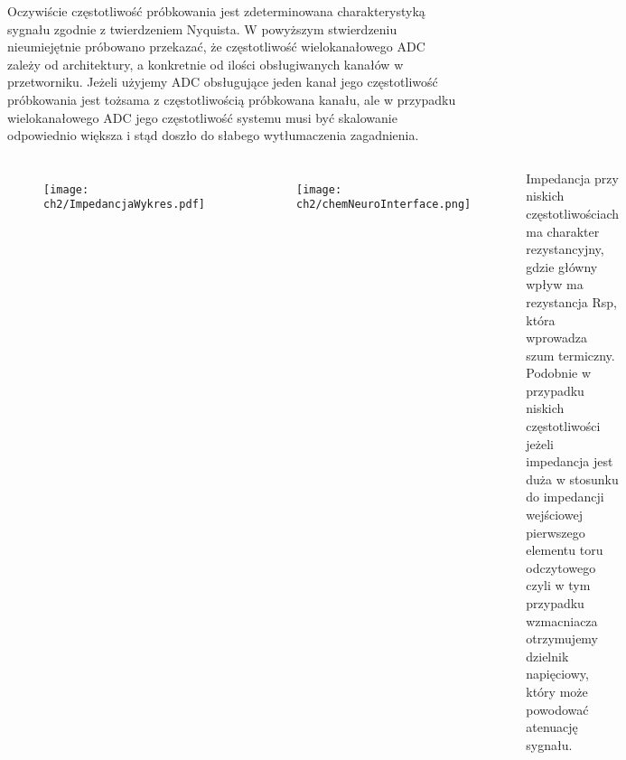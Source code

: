\begin{frame}[t]
    \begin{block}{\dk}
    \end{block}
    Oczywiście częstotliwość próbkowania jest zdeterminowana charakterystyką sygnału zgodnie z twierdzeniem Nyquista.
    W powyższym stwierdzeniu nieumiejętnie próbowano przekazać, że częstotliwość wielokanałowego ADC zależy od architektury, a konkretnie od ilości obsługiwanych kanałów w przetworniku.
    Jeżeli użyjemy ADC obsługujące jeden kanał jego częstotliwość próbkowania jest tożsama z częstotliwością próbkowana kanału, ale w przypadku wielokanałowego ADC jego częstotliwość systemu musi być skalowanie odpowiednio większa i stąd doszło do słabego wytłumaczenia zagadnienia.
    
\end{frame}

\begin{frame}[t]
    \begin{block}{\dk}
    \end{block}

    \begin{columns}

        \vspace{-1em}
        \begin{figure}[H]
            \texttt{[image: ch2/ImpedancjaWykres.pdf]}
        \end{figure}
        \vspace{-1em}
        \begin{figure}[H]
            \texttt{[image: ch2/chemNeuroInterface.png]}
        \end{figure}
    
        Impedancja przy niskich częstotliwościach ma charakter rezystancyjny, gdzie główny wpływ ma rezystancja Rsp, która wprowadza szum termiczny. 
        Podobnie w przypadku niskich częstotliwości jeżeli impedancja jest duża w stosunku do impedancji wejściowej pierwszego elementu toru odczytowego czyli w tym przypadku wzmacniacza otrzymujemy dzielnik napięciowy, który może powodować atenuację sygnału. 
        
    \end{columns}
\end{frame}

